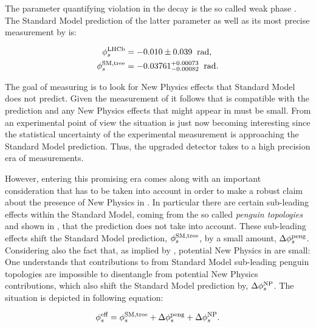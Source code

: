 The parameter quantifying \CP violation in the \BsJpsiPhi decay is the so called weak phase \phis.
The Standard Model prediction of the latter parameter as well as its most precise measurement by
\lhcb is:

\begin{subequations}
  \label{app_phis_lhcb_theo}
  \begin{align}
  \centering
  \phiS{\lhcb}           &=  -0.010 \pm 0.039  \;\; \text{rad},
  \label{app_phis_lhcb}\\
  \phiS{SM,tree}  &= -0.03761 {}^{+0.00073}_{-0.00082}  \;\; \text{rad}.
  \label{app_phis_theo}
\end{align}
\end{subequations}

\noindent The goal of measuring \phis is to look for New Physics effects that Standard Model
does not predict. Given the measurement of  it follows that \phis is compatible
with the prediction and any New Physics effects that might appear in \phis must be small.
From an experimental point of view the situation is just now becoming interesting
since the statistical uncertainty of the experimental measurement is approaching the Standard
Model prediction. Thus, the upgraded \lhcb detector takes \phis to a high precision era
of measurements.

However, entering this promising era comes along with an important consideration
that has to be taken into account in order to make a robust claim about the presence of New Physics
in \phis. In particular there are certain sub-leading effects within the Standard Model, coming from
the so called {\it penguin topologies} and shown in , that the
\phis prediction does not take into account. These sub-leading effects shift
the Standard Model prediction, $\phi_{s}^{\tiny \text{SM,tree}}$, by a small amount, $\Delta\phi_{s}^{\tiny\text{peng}}$.
Considering also the fact that, as implied by , potential New Physics in
\phis are small: One understands that contributions to \phis from Standard Model sub-leading penguin
topologies are impossible to disentangle from potential New Physics contributions, which also shift
the Standard Model prediction by, $\Delta\phi_{s}^{\tiny \text{NP}}$. The situation is depicted in
following equation:

\begin{equation}
\centering
 \phis^{\text {eff}} = \phis^{\tiny \text{SM,tree}} + \Delta\phiS{peng} + \Delta\phis^{\tiny \text{NP}}.
 \label{app_phis_sm_peng}
\end{equation}

